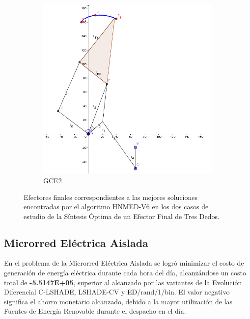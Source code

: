 \begin{figure}[p]
	\begin{subfigure}[b]{0.49\linewidth}
		\includegraphics[width=\textwidth]{Figures/GCE2}
		\caption{GCE2} \label{fig:G2} 
	\end{subfigure}
	\caption{Efectores finales  correspondientes a las mejores soluciones encontradas por el algoritmo HNMED-V6 en los
		dos casos de estudio de la Síntesis Óptima de un Efector Final de Tres Dedos.} \label{fig: Efectores finales  correspondientes a las mejores soluciones encontradas por el algoritmo HNMED-V6 en los dos casos de estudio de la Síntesis Óptima de un Efector Final de Tres Dedos.} 
\end{figure}	
\newpage

\subsection{Microrred Eléctrica Aislada}

En el problema de la Microrred Eléctrica Aislada se logró minimizar el costo de generación de energía eléctrica durante cada hora del día, alcanzándose un costo total de \textbf{-5.5147E+05}, superior al alcanzado por las variantes de la Evolución Diferencial C-LSHADE, LSHADE-CV y ED/rand/1/bin. El valor negativo significa el ahorro monetario alcanzado, debido a la mayor utilización de las Fuentes de Energía Renovable durante el despacho en el día.



